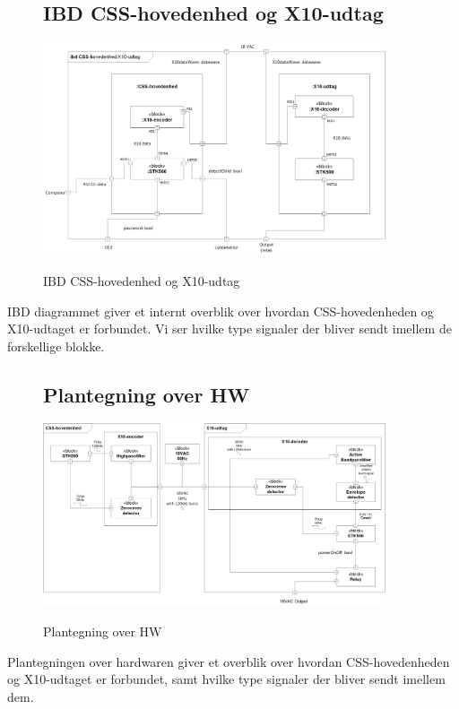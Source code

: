 \begin{figure}[H] \centering
\subsection{IBD CSS-hovedenhed og X10-udtag}
{\includegraphics[width=0.9\textwidth]{billeder/diagrammer/IBD_Hovedenhed_Modtager}}
\caption{IBD CSS-hovedenhed og X10-udtag}
\label{lab:ibdhovedenhedmodtager}
\raggedright
\end{figure}
IBD diagrammet giver et internt overblik over hvordan CSS-hovedenheden og X10-udtaget er forbundet. Vi ser hvilke type signaler der bliver sendt imellem de forskellige blokke.

\begin{figure}[H] \centering
\subsection{Plantegning over HW}
{\includegraphics[width=0.9\textwidth]{billeder/diagrammer/Plantegning_over_HW}}
\caption{Plantegning over HW}
\label{lab:Plantegning over HW}
\raggedright
\end{figure}
Plantegningen over hardwaren giver et overblik over hvordan CSS-hovedenheden og X10-udtaget er forbundet, samt hvilke type signaler der bliver sendt imellem dem.

